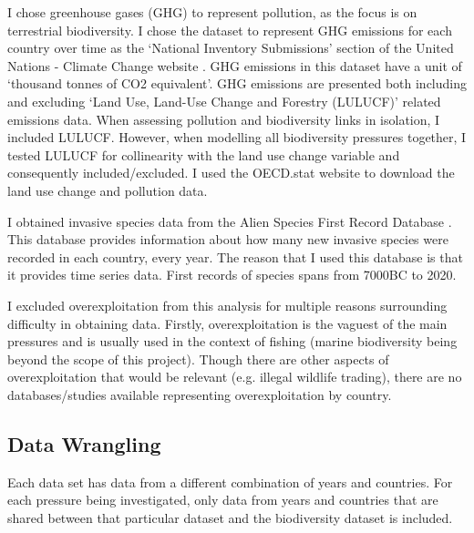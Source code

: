 \documentclass[11pt, a4paper, titlepage]{article}
\begin{document}
	I chose greenhouse gases (GHG) to represent pollution, as the focus is on terrestrial biodiversity. I chose the dataset to represent GHG emissions for each country over time as the `National Inventory Submissions' section of the United Nations - Climate Change website \citep{UN2022}. GHG emissions in this dataset have a unit of `thousand tonnes of CO2 equivalent'. GHG emissions are presented both including and excluding `Land Use, Land-Use Change and Forestry (LULUCF)' related emissions data. When assessing pollution and biodiversity links in isolation, I included LULUCF. However, when modelling all biodiversity pressures together, I tested LULUCF for collinearity with the land use change variable and consequently included/excluded. I used the OECD.stat website to download the land use change and pollution data. 
	
	I obtained invasive species data from the Alien Species First Record Database \citep{seebens2017no, seebens2018global}. This database provides information about how many new invasive species were recorded in each country, every year. The reason that I used this database is that it provides time series data. First records of species spans from 7000BC to 2020.  
	
	I excluded overexploitation from this analysis for multiple reasons surrounding difficulty in obtaining data. Firstly, overexploitation is the vaguest of the main pressures and is usually used in the context of fishing (marine biodiversity being beyond the scope of this project). Though there are other aspects of overexploitation that would be relevant (e.g. illegal wildlife trading), there are no databases/studies available representing overexploitation by country.

	\subsection*{Data Wrangling}
	
	Each data set has data from a different combination of years and countries. For each pressure being investigated, only data from years and countries that are shared between that particular dataset and the biodiversity dataset is included. 
	
\end{document}
